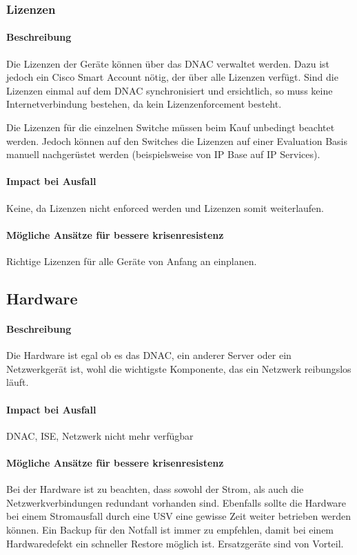 \subsubsection{Lizenzen}
\paragraph{Beschreibung}
Die Lizenzen der Geräte können über das DNAC verwaltet werden. Dazu ist jedoch ein Cisco Smart Account nötig, der über alle Lizenzen verfügt. Sind die Lizenzen einmal auf dem DNAC synchronisiert und ersichtlich, so muss keine Internetverbindung bestehen, da kein Lizenzenforcement besteht.

Die Lizenzen für die einzelnen Switche müssen beim Kauf unbedingt beachtet werden. Jedoch können auf den Switches die Lizenzen auf einer Evaluation Basis manuell nachgerüstet werden (beispielsweise von IP Base auf IP Services).

\paragraph{Impact bei Ausfall}
Keine, da Lizenzen nicht enforced werden und Lizenzen somit weiterlaufen.

\paragraph{Mögliche Ansätze für bessere krisenresistenz}
Richtige Lizenzen für alle Geräte von Anfang an einplanen.

\subsection{Hardware}
\paragraph{Beschreibung}
Die Hardware ist egal ob es das DNAC, ein anderer Server oder ein Netzwerkgerät ist, wohl die wichtigste Komponente, das ein Netzwerk reibungslos läuft.

\paragraph{Impact bei Ausfall}
DNAC, ISE, Netzwerk nicht mehr verfügbar

\paragraph{Mögliche Ansätze für bessere krisenresistenz}
Bei der Hardware ist zu beachten, dass sowohl der Strom, als auch die Netzwerkverbindungen redundant vorhanden sind. Ebenfalls sollte die Hardware bei einem Stromausfall durch eine USV eine gewisse Zeit weiter betrieben werden können. Ein Backup für den Notfall ist immer zu empfehlen, damit bei einem Hardwaredefekt ein schneller Restore möglich ist.
Ersatzgeräte sind von Vorteil.

